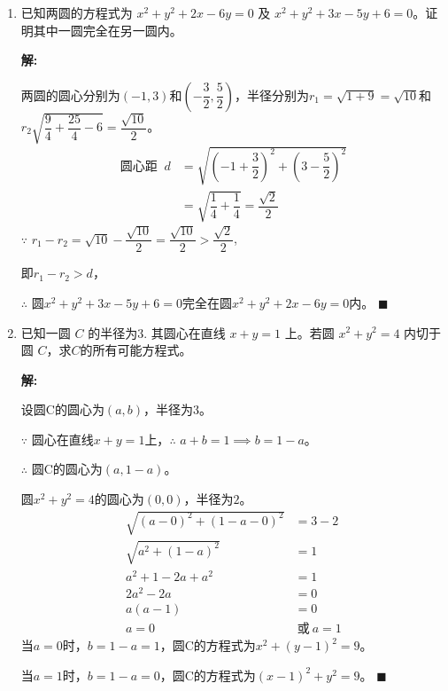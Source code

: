 \documentclass[10pt]{article}
\newcommand{\sol}{\textbf{解:} }
\begin{document}
\begin{enumerate}[leftmargin=*]
  \item 已知两圆的方程式为 $x^{2}+y^{2}+2 x-6 y=0$ 及 $x^{2}+y^{2}+3 x-5 y+6=0$。证明其中一圆完全在另一圆内。

        \sol{}

        两圆的圆心分别为$(-1, 3)$和$\left(-\dfrac{3}{2}, \dfrac{5}{2}\right)$，半径分别为$r_1 = \sqrt{1 + 9} = \sqrt{10}$和$r_2 \sqrt{\dfrac{9}{4} + \dfrac{25}{4} - 6} = \dfrac{\sqrt{10}}{2}$。
        \begin{align*}
          \text{圆心距 }\ d & = \sqrt{\left(-1 + \dfrac{3}{2}\right)^2 + \left(3 - \dfrac{5}{2}\right)^2} \\
                         & = \sqrt{\dfrac{1}{4} + \dfrac{1}{4}} = \dfrac{\sqrt{2}}{2}
        \end{align*}
        $\because$ $r_1 - r_2 = \sqrt{10} - \dfrac{\sqrt{10}}{2} = \dfrac{\sqrt{10}}{2} > \dfrac{\sqrt{2}}{2}$,

        即$r_1 - r_2 > d$，

        $\therefore$ 圆$x^{2}+y^{2}+3x-5y+6=0$完全在圆$x^{2}+y^{2}+2x-6y=0$内。 \hfill$\blacksquare$

        \newpage
  \item 已知一圆 $C$ 的半径为$3$. 其圆心在直线 $x+y=1$ 上。若圆 $x^{2}+y^{2}=4$ 内切于圆 $C$，求$C$的所有可能方程式。

        \sol{}

        设圆C的圆心为$(a, b)$，半径为$3$。

        $\because$ 圆心在直线$x + y = 1$上，$\therefore$ $a + b = 1 \implies b = 1 - a$。

        $\therefore$ 圆C的圆心为$(a, 1 - a)$。

        圆$x^{2} + y^{2} = 4$的圆心为$(0, 0)$，半径为$2$。
        \begin{align*}
          \sqrt{(a - 0)^{2} + (1 - a - 0)^{2}} & = 3 - 2           \\
          \sqrt{a^2 + (1 - a)^2}               & = 1               \\
          a^2 + 1 - 2a + a^2                   & = 1               \\
          2a^2 - 2a                            & = 0               \\
          a(a - 1)                             & = 0               \\
          a = 0                                & \ \text{或}\ a = 1
        \end{align*}
        当$a = 0$时，$b = 1 - a = 1$，圆C的方程式为$x^2 + (y - 1)^2 = 9$。

        当$a = 1$时，$b = 1 - a = 0$，圆C的方程式为$(x - 1)^2 + y^2 = 9$。 \hfill$\blacksquare$
\end{enumerate}
\end{document}
